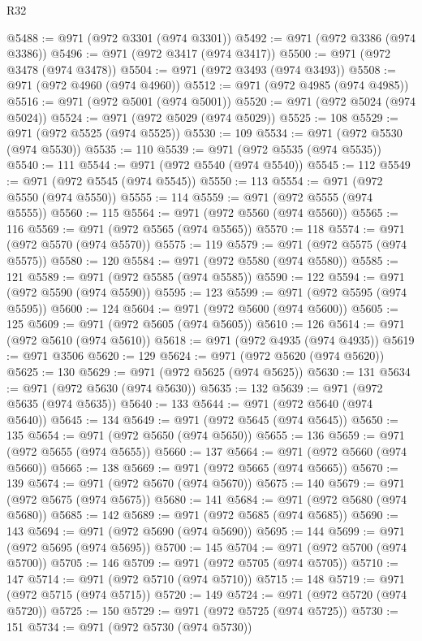\begin{lexlean}{R32}
\begin{coremodule}
@5488 := @971 (@972 @3301 (@974 @3301))
@5492 := @971 (@972 @3386 (@974 @3386))
@5496 := @971 (@972 @3417 (@974 @3417))
@5500 := @971 (@972 @3478 (@974 @3478))
@5504 := @971 (@972 @3493 (@974 @3493))
@5508 := @971 (@972 @4960 (@974 @4960))
@5512 := @971 (@972 @4985 (@974 @4985))
@5516 := @971 (@972 @5001 (@974 @5001))
@5520 := @971 (@972 @5024 (@974 @5024))
@5524 := @971 (@972 @5029 (@974 @5029))
@5525 := 108
@5529 := @971 (@972 @5525 (@974 @5525))
@5530 := 109
@5534 := @971 (@972 @5530 (@974 @5530))
@5535 := 110
@5539 := @971 (@972 @5535 (@974 @5535))
@5540 := 111
@5544 := @971 (@972 @5540 (@974 @5540))
@5545 := 112
@5549 := @971 (@972 @5545 (@974 @5545))
@5550 := 113
@5554 := @971 (@972 @5550 (@974 @5550))
@5555 := 114
@5559 := @971 (@972 @5555 (@974 @5555))
@5560 := 115
@5564 := @971 (@972 @5560 (@974 @5560))
@5565 := 116
@5569 := @971 (@972 @5565 (@974 @5565))
@5570 := 118
@5574 := @971 (@972 @5570 (@974 @5570))
@5575 := 119
@5579 := @971 (@972 @5575 (@974 @5575))
@5580 := 120
@5584 := @971 (@972 @5580 (@974 @5580))
@5585 := 121
@5589 := @971 (@972 @5585 (@974 @5585))
@5590 := 122
@5594 := @971 (@972 @5590 (@974 @5590))
@5595 := 123
@5599 := @971 (@972 @5595 (@974 @5595))
@5600 := 124
@5604 := @971 (@972 @5600 (@974 @5600))
@5605 := 125
@5609 := @971 (@972 @5605 (@974 @5605))
@5610 := 126
@5614 := @971 (@972 @5610 (@974 @5610))
@5618 := @971 (@972 @4935 (@974 @4935))
@5619 := @971 @3506
@5620 := 129
@5624 := @971 (@972 @5620 (@974 @5620))
@5625 := 130
@5629 := @971 (@972 @5625 (@974 @5625))
@5630 := 131
@5634 := @971 (@972 @5630 (@974 @5630))
@5635 := 132
@5639 := @971 (@972 @5635 (@974 @5635))
@5640 := 133
@5644 := @971 (@972 @5640 (@974 @5640))
@5645 := 134
@5649 := @971 (@972 @5645 (@974 @5645))
@5650 := 135
@5654 := @971 (@972 @5650 (@974 @5650))
@5655 := 136
@5659 := @971 (@972 @5655 (@974 @5655))
@5660 := 137
@5664 := @971 (@972 @5660 (@974 @5660))
@5665 := 138
@5669 := @971 (@972 @5665 (@974 @5665))
@5670 := 139
@5674 := @971 (@972 @5670 (@974 @5670))
@5675 := 140
@5679 := @971 (@972 @5675 (@974 @5675))
@5680 := 141
@5684 := @971 (@972 @5680 (@974 @5680))
@5685 := 142
@5689 := @971 (@972 @5685 (@974 @5685))
@5690 := 143
@5694 := @971 (@972 @5690 (@974 @5690))
@5695 := 144
@5699 := @971 (@972 @5695 (@974 @5695))
@5700 := 145
@5704 := @971 (@972 @5700 (@974 @5700))
@5705 := 146
@5709 := @971 (@972 @5705 (@974 @5705))
@5710 := 147
@5714 := @971 (@972 @5710 (@974 @5710))
@5715 := 148
@5719 := @971 (@972 @5715 (@974 @5715))
@5720 := 149
@5724 := @971 (@972 @5720 (@974 @5720))
@5725 := 150
@5729 := @971 (@972 @5725 (@974 @5725))
@5730 := 151
@5734 := @971 (@972 @5730 (@974 @5730))

\end{coremodule}
\end{lexlean}
